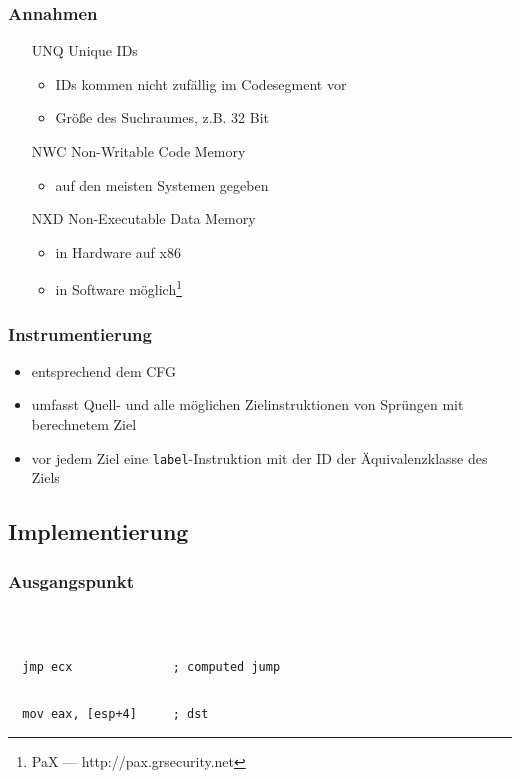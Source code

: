 \documentclass[serif,slidestop,compress,red]{beamer}
\begin{document}
\begin{frame}
  \frametitle{Annahmen}
  \begin{itemize}
    \item[UNQ] Unique IDs
    \begin{itemize}
      \item IDs kommen nicht zufällig im Codesegment vor
      \item Größe des Suchraumes, z.B. 32 Bit
    \end{itemize}
    \item[NWC] Non-Writable Code Memory
    \begin{itemize}
      \item auf den meisten Systemen gegeben
    \end{itemize}
    \item[NXD] Non-Executable Data Memory
    \begin{itemize}
      \item in Hardware auf x86
      \item in Software möglich\footnote{PaX — http://pax.grsecurity.net}
    \end{itemize}
  \end{itemize}
\end{frame}

\begin{frame}
  \frametitle{Instrumentierung}
  \begin{itemize}
    \item entsprechend dem CFG
    \item umfasst Quell- und alle möglichen Zielinstruktionen von Sprüngen mit berechnetem Ziel
    \item vor jedem Ziel eine \texttt{label}-Instruktion mit der ID der Äquivalenzklasse des Ziels
  \end{itemize}
\end{frame}

\subsection{Implementierung}

\begin{frame}[fragile]
  \frametitle{Ausgangspunkt}
  \begin{lstlisting}[title=Quelle]



  jmp ecx              ; computed jump
  \end{lstlisting}
  \begin{lstlisting}[title=Ziel]

  mov eax, [esp+4]     ; dst
  \end{lstlisting}
\end{frame}
\end{document}
